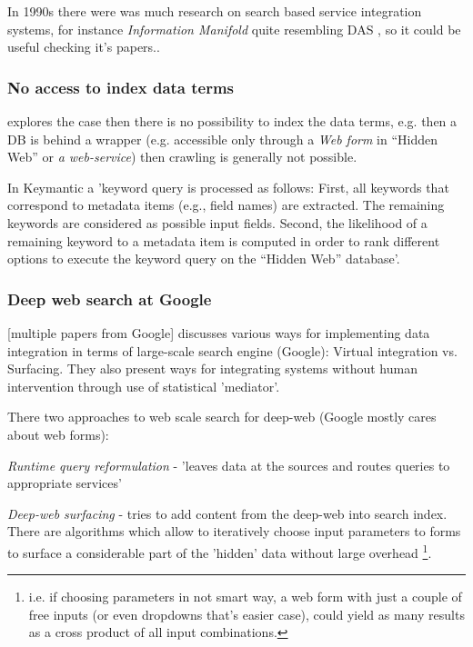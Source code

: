In 1990s there were was much research on search based service integration systems, for instance \textit{Information Manifold} quite resembling DAS {\color{red},  so it could be useful checking it's papers.}.

\subsubsection*{No access to index data terms}

\cite{Keymantic10, semantics_without_access} explores the case then there is no possibility to index the data terms, e.g. then a DB is behind a wrapper (e.g. accessible only through a \textit{Web form} in “Hidden Web” or \textit{a web-service}) then crawling is generally not possible.

In Keymantic\cite{Keymantic10} a 'keyword query is processed as follows: First, all keywords that correspond to metadata items (e.g., field names) are extracted. The remaining
keywords are considered as possible input fields. Second, the likelihood of a remaining keyword to a metadata item is computed in order to rank different options to execute the keyword query on the
“Hidden Web” database'\cite[p.942]{ethz2012}.


\subsubsection*{Deep web search at Google}
[multiple papers from Google] discusses various ways for implementing data integration in terms of large-scale search engine (Google): Virtual integration vs. Surfacing. They also present ways for integrating systems without human intervention through use of statistical 'mediator'.

There two approaches to web scale search for deep-web (Google mostly cares about web forms):

\textit{Runtime query reformulation} - 'leaves data at the sources and routes queries to appropriate services'\cite[p. 1]{webscale_paygo} 

\textit{Deep-web surfacing} - tries to add content from the deep-web into search index. There are algorithms which allow to iteratively choose input parameters to forms to surface a considerable part of the 'hidden' data without large overhead%
	\footnote{i.e. if choosing parameters in not smart way, a web form with just a couple of free inputs (or even dropdowns that's easier case), could yield as many results as a cross product of all input combinations.}.

